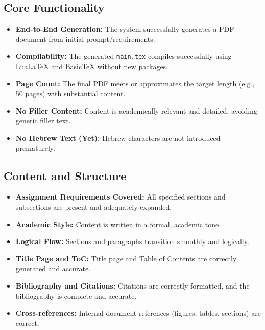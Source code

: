 \documentclass{custom-academic-template}
\begin{document}
\subsection{Core Functionality}
\begin{itemize}
    \item [ ] 	\textbf{End-to-End Generation:} The system successfully generates a PDF document from initial prompt/requirements.
    \item [ ] 	\textbf{Compilability:} The generated 	\texttt{main.tex} compiles successfully using LuaLaTeX and BasicTeX without new packages.
    \item [ ] 	\textbf{Page Count:} The final PDF meets or approximates the target length (e.g., 50 pages) with substantial content.
    \item [ ] 	\textbf{No Filler Content:} Content is academically relevant and detailed, avoiding generic filler text.
    \item [ ] 	\textbf{No Hebrew Text (Yet):} Hebrew characters are not introduced prematurely.
\end{itemize}

\subsection{Content and Structure}
\begin{itemize}
    \item [ ] 	\textbf{Assignment Requirements Covered:} All specified sections and subsections are present and adequately expanded.
    \item [ ] 	\textbf{Academic Style:} Content is written in a formal, academic tone.
    \item [ ] 	\textbf{Logical Flow:} Sections and paragraphs transition smoothly and logically.
    \item [ ] 	\textbf{Title Page and ToC:} Title page and Table of Contents are correctly generated and accurate.
    \item [ ] 	\textbf{Bibliography and Citations:} Citations are correctly formatted, and the bibliography is complete and accurate.
    \item [ ] 	\textbf{Cross-references:} Internal document references (figures, tables, sections) are correct.
\end{itemize}
\end{document}
